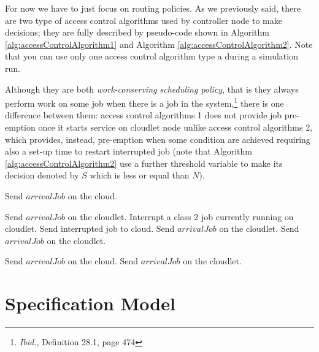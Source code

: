 \documentclass[10pt,a4paper]{article}
\begin{document}
For now we have to just focus on routing policies. As we previously said, there are two type of access control algorithms used by controller node to make decisions; they are fully described by pseudo-code shown in Algorithm \ref{alg:accessControlAlgorithm1} and Algorithm \ref{alg:accessControlAlgorithm2}. Note that you can use only one access control algorithm type a during a simulation run.

Although they are both \textit{work-conserving scheduling policy}, that is they always perform work on some job when there is a job in the system,\footnote{\textit{Ibid.}, Definition 28.1, page 474} there is one difference between them: access control algorithms 1 does not provide job pre-emption once it starts service on cloudlet node unlike access control algorithms 2, which provides, instead, pre-emption when some condition are achieved requiring also a set-up time to restart interrupted job (note that Algorithm \ref{alg:accessControlAlgorithm2} use a further threshold variable to make its decision denoted by $S$ which is less or equal than $N$).


\begin{algorithm}[h]
\caption{}\label{alg:accessControlAlgorithm2}
\begin{algorithmic}[h!]




	\State Send $\textit{arrivalJob}$ on the cloud.

	\State Send $\textit{arrivalJob}$ on the cloudlet.
	\State Interrupt a class 2 job currently running on cloudlet.
	\State Send interrupted job to cloud.
	\State Send $\textit{arrivalJob}$ on the cloudlet.
\Else 	
 	\State Send $\textit{arrivalJob}$ on the cloudlet.
\EndIf



\Else 

	\State Send $\textit{arrivalJob}$ on the cloud.
\Else 	
 	\State Send $\textit{arrivalJob}$ on the cloudlet.
\EndIf

\EndIf

\EndFunction

\end{algorithmic}
\end{algorithm}

\clearpage
\newpage
\section{Specification  Model}
\end{document}

